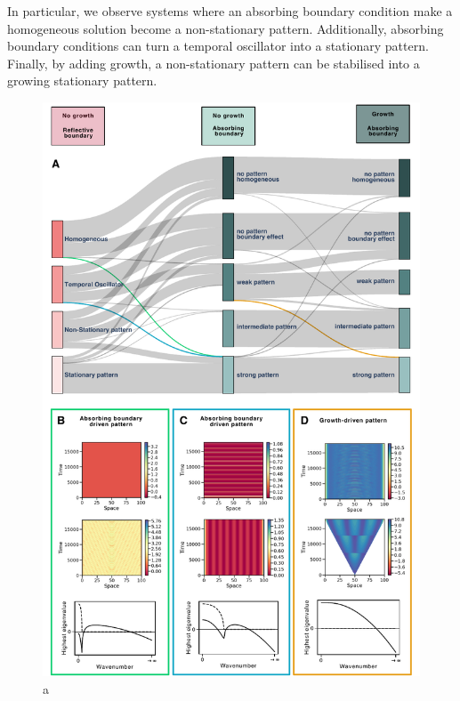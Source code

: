 In particular, we observe systems where an absorbing boundary condition make a homogeneous solution become a non-stationary pattern. Additionally, absorbing boundary conditions can turn a temporal oscillator into a stationary pattern. Finally, by adding growth, a non-stationary pattern can be stabilised into a growing stationary pattern.
\begin{figure}[H]
    \includegraphics[width=1\textwidth]{figures/boundaries_growth} %
    \caption{a}
    \label{fig:boundariesgrowth} %
\end{figure}